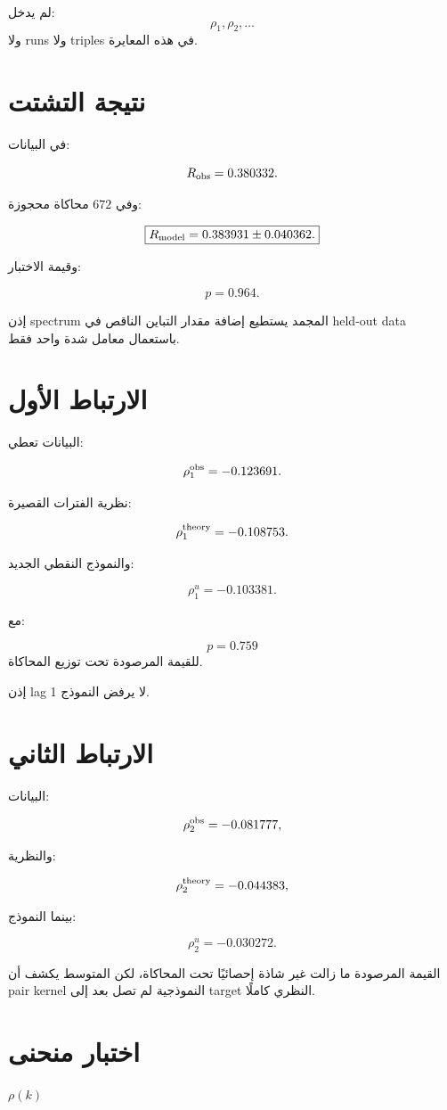 \documentclass[12pt]{article}
\begin{document}
لم يدخل:
\[
\rho_1,\rho_2,\ldots
\]
ولا runs ولا triples في هذه المعايرة.

\section{نتيجة التشتت}

في البيانات:

\[
R_{\rm obs}
=
0.380332.
\]

وفي \(672\) محاكاة محجوزة:

\[
\boxed{
R_{\rm model}
=
0.383931
\pm
0.040362.
}
\]

وقيمة الاختبار:

\[
\boxed{
p=0.964.
}
\]

إذن spectrum المجمد يستطيع إضافة مقدار التباين الناقص في held-out data
باستعمال معامل شدة واحد فقط.

\section{الارتباط الأول}

البيانات تعطي:

\[
\rho_1^{\rm obs}
=
-0.123691.
\]

نظرية الفترات القصيرة:

\[
\rho_1^{\rm theory}
=
-0.108753.
\]

والنموذج النقطي الجديد:

\[
\boxed{
\rho_1^{u}
=
-0.103381.
}
\]

مع:

\[
p=0.759
\]
للقيمة المرصودة تحت توزيع المحاكاة.

إذن lag 1 لا يرفض النموذج.

\section{الارتباط الثاني}

البيانات:

\[
\rho_2^{\rm obs}
=
-0.081777,
\]

والنظرية:

\[
\rho_2^{\rm theory}
=
-0.044383,
\]

بينما النموذج:

\[
\rho_2^u
=
-0.030272.
\]

القيمة المرصودة ما زالت غير شاذة إحصائيًا تحت المحاكاة، لكن المتوسط يكشف
أن pair kernel النموذجية لم تصل بعد إلى target النظري كاملًا.

\section{اختبار منحنى } \texorpdfstring{\(\rho(k)\)}{rho(k)}
\end{document}
